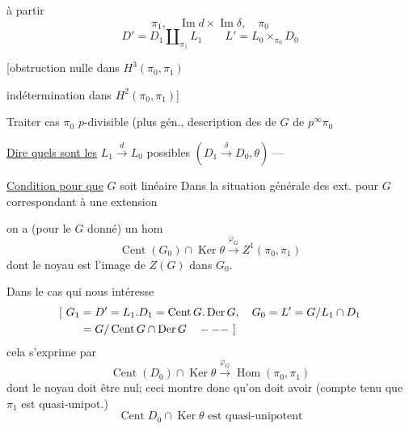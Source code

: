  à partir
\[
\pi_1,\quad \operatorname{Im}d\times\operatorname{Im}\delta,\quad \pi_0
\]
\[
D'=D_1\amalg_{\pi_1}L_1\qquad L'=L_0\times_{\pi_0}D_0
\]

[obstruction nulle dans $H^3(\pi_0,\pi_1)$

indétermination dans $H^2(\pi_0,\pi_1)$]

Traiter cas $\pi_0$ $p$-divisible (plus gén., description des
  de $G$  de $p^\infty\pi_0$

\uline{Dire quels sont les} $L_1\xrightarrow{d}L_0$ possibles
$(D_1\xrightarrow{\delta}D_0,\theta)$ ---

\uline{Condition pour que} $G$ soit linéaire
Dans la situation générale des ext. pour $G$ correspondant
à une extension


on a (pour le $G$ donné) un hom
\[
\operatorname{Cent}(G_0)\cap\operatorname{Ker}\theta\xrightarrow{\varphi_G}Z^1(\pi_0,\pi_1)
\]
dont le noyau est l'image de $Z(G)$ dans $G_0$.


Dans le cas qui nous intéresse
\[
\begin{aligned}
\relax[\ G_1&=D'=L_1.D_1=\operatorname{Cent}G.\operatorname{Der}G,\quad
G_0=L'=G/L_1\cap D_1\\
&=G/\operatorname{Cent}G\cap\operatorname{Der}G\quad ---\ ]
\end{aligned}
\]
cela  s'exprime par
\[
\operatorname{Cent}(D_0)\cap\operatorname{Ker}\theta\xrightarrow{\varphi_G}\operatorname{Hom}(\pi_0,\pi_1)
\]
dont le noyau doit être nul; ceci montre
donc qu'on doit avoir (compte tenu
que $\pi_1$ est quasi-unipot.)
\[
\boxed{\operatorname{Cent}D_0\cap\operatorname{Ker}\theta\text{ est quasi-unipotent}}
\]

